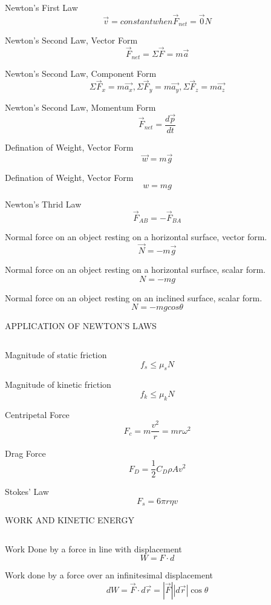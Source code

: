 \documentclass[12pt, letterpaper, twoside]{article}
\begin{document}
Newton's First Law
$$\overrightarrow{v} = constant when \overrightarrow{F}_{net} = \overrightarrow{0} N$$


Newton's Second Law, Vector Form
$$\overrightarrow{F}_{net} = \Sigma \overrightarrow{F} = m \overrightarrow{a}$$


Newton's Second Law, Component Form
$$\Sigma \overrightarrow{F}_x = m \overrightarrow{a_x}, \Sigma \overrightarrow{F}_y = m \overrightarrow{a_y},\Sigma \overrightarrow{F}_z = m \overrightarrow{a_z}$$



Newton's Second Law, Momentum Form
$$\overrightarrow{F}_{net} = \frac{d \overrightarrow{p}}{dt}$$


Defination of Weight, Vector Form
$$\overrightarrow{w} = m \overrightarrow{g}$$


Defination of Weight, Vector Form
$$w = mg$$


Newton's Thrid Law
$$\overrightarrow{F}_{AB} = - \overrightarrow{F}_{BA}$$

Normal force on an object resting on a horizontal surface,
vector form.
$$\overrightarrow{N} = -m \overrightarrow{g}$$

Normal force on an object resting on a horizontal surface,
scalar form.
$$N = -mg$$

Normal force on an object resting on an inclined surface,
scalar form.
$$N = -m g cos \theta$$



\newpage

APPLICATION OF NEWTON'S LAWS

$$ $$

Magnitude of static friction
$$f_s \leq \mu_s N$$


Magnitude of kinetic friction
$$f_k \leq \mu_k N$$


Centripetal Force
$$F_c = m \frac{v^2}{r} = mr\omega^2$$



Drag Force
$$F_D=\frac{1}{2} C_D \rho A v^2 $$


Stokes' Law
$$F_s = 6 \pi r \eta v $$








\newpage

WORK AND KINETIC ENERGY

$$ $$


Work Done by a force in line with displacement
$$ W = F \cdot d $$


Work done by a force over an infinitesimal displacement
$$ dW = \overrightarrow{F} \cdot d \overrightarrow{r} = | \overrightarrow{F} | | d \overrightarrow{r} | \cos \theta $$
\end{document}

